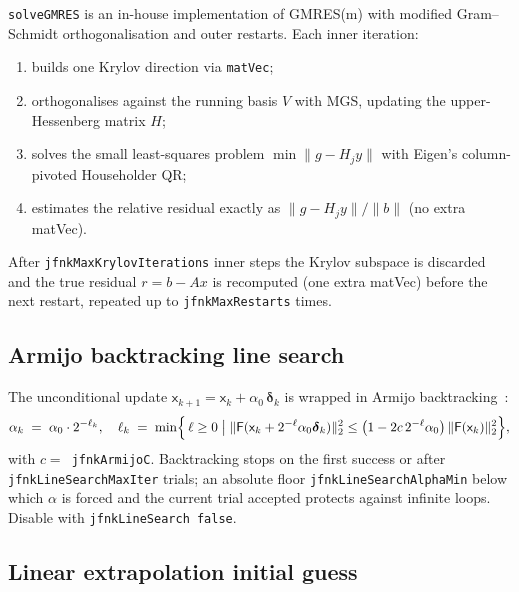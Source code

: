 \documentclass[11pt,a4paper]{article}
\newcommand{\code}[1]{\texttt{\small #1}}
\begin{document}
\code{solveGMRES} is an in-house implementation of GMRES(m) with
modified Gram--Schmidt orthogonalisation and outer restarts. Each
inner iteration:
\begin{enumerate}[topsep=0pt,itemsep=2pt]
  \item builds one Krylov direction via \code{matVec};
  \item orthogonalises against the running basis $V$ with MGS, updating
        the upper-Hessenberg matrix $H$;
  \item solves the small least-squares problem
        $\min \lVert g - H_{j} y \rVert$ with Eigen's
        column-pivoted Householder QR;
  \item estimates the relative residual exactly as
        $\lVert g - H_{j} y \rVert / \lVert b \rVert$ (no extra
        matVec).
\end{enumerate}
After \code{jfnkMaxKrylovIterations} inner steps the Krylov subspace
is discarded and the true residual $r = b - A x$ is recomputed
(one extra matVec) before the next restart, repeated up to
\code{jfnkMaxRestarts} times.

\subsection{Armijo backtracking line search}

The unconditional update $\mathsf{x}_{k+1} = \mathsf{x}_{k} +
\alpha_{0}\, \boldsymbol{\delta}_{k}$ is wrapped in Armijo
backtracking~\cite{noceWright}:
\begin{equation}
  \alpha_{k} \;=\; \alpha_{0} \cdot 2^{-\ell_{k}},
   \quad
   \ell_{k} \;=\; \min\Bigl\{\, \ell \ge 0 \;\big|\;
       \lVert \mathsf{F}(\mathsf{x}_{k} + 2^{-\ell}\alpha_{0}
                          \boldsymbol{\delta}_{k}) \rVert_{2}^{2}
       \le \bigl(1 - 2c\, 2^{-\ell}\alpha_{0}\bigr)\,
           \lVert \mathsf{F}(\mathsf{x}_{k}) \rVert_{2}^{2}
       \Bigr\},
   \label{eq:armijo}
\end{equation}
with $c = $~\code{jfnkArmijoC}. Backtracking stops on the first success
or after \code{jfnkLineSearchMaxIter} trials; an absolute floor
\code{jfnkLineSearchAlphaMin} below which $\alpha$ is forced and the
current trial accepted protects against infinite loops. Disable with
\code{jfnkLineSearch~false}.

\subsection{Linear extrapolation initial guess}
\end{document}

